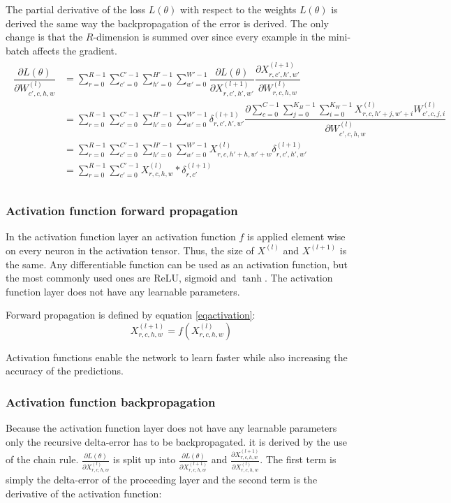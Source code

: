 \documentclass[a4paper,11pt,twoside]{article}
\newcommand*{\pd}[2]{\ensuremath{\dfrac{\partial #1}{\partial #2}}}
\newcommand*{\inpd}[2]{\ensuremath{\frac{\partial #1}{\partial #2}}}
\begin{document}
The partial derivative of the loss $L(\theta)$ with respect to the weights $L(\theta)$ is derived the same way the backpropagation of the error is derived. The only change is that the $R$-dimension is summed over since every example in the mini-batch affects the gradient. \cite{cs231n} \cite{webconv1} \cite{webconv2} \cite{webconv3} 
\begin{align}
\begin{split}
	\pd{L(\theta)}{W^{(l)}_{c',c,h,w}}
		& = \sum^{R-1}_{r=0} \sum^{C'-1}_{c'=0} \sum^{H'-1}_{h'=0} \sum^{W'-1}_{w'=0} \pd{L(\theta)}{X^{(l+1)}_{r,c',h',w'}} \pd{X^{(l+1)}_{r,c',h',w'}}{W^{(l)}_{r,c,h,w}} \\
		& = \sum^{R-1}_{r=0} \sum_{c'=0}^{C'-1} \sum^{H'-1}_{h'=0} \sum^{W'-1}_{w'=0} \delta^{(l+1)}_{r,c',h',w'} \pd{\sum\limits^{C-1}_{c=0} \sum\limits^{K_H-1}_{j=0} \sum\limits^{K_W-1}_{i=0} X^{(l)}_{r, c, h'+j, w'+i}W^{(l)}_{c', c, j, i}}{W^{(l)}_{c',c,h,w}} \\
		& = \sum^{R-1}_{r=0} \sum^{C'-1}_{c'=0} \sum^{H'-1}_{h'=0} \sum^{W'-1}_{w'=0} X^{(l)}_{r, c, h'+h, w'+w} \delta^{(l+1)}_{r,c',h',w'} \\
		& = \sum^{R-1}_{r=0} \sum^{C'-1}_{c'=0} X^{(l)}_{r, c, h, w} * \delta^{(l+1)}_{r,c'} \\
\end{split}
\end{align}

\subsubsection{Activation function forward propagation}
In the activation function layer an activation function $f$ is applied element wise on every neuron in the activation tensor. Thus, the size of $X^{(l)}$ and $X^{(l+1)}$ is the same. Any differentiable function can be used as an activation function, but the most commonly used ones are ReLU, sigmoid and $\tanh$. The activation function layer does not have any learnable parameters. \cite{convmath}
 
Forward propagation is defined by equation \eqref{eqactivation}:
\begin{equation}\label{eqactivation}
X^{(l+1)}_{r,c,h,w} = f(X^{(l)}_{r,c,h,w})
\end{equation}

Activation functions enable the network to learn faster while also increasing the accuracy of the predictions. \cite{cs231n}

\subsubsection{Activation function backpropagation}
Because the activation function layer does not have any learnable parameters only the recursive delta-error has to be backpropagated. it is derived by the use of the chain rule. $\inpd{L(\theta)}{X^{(l)}_{r,c,h,w}}$ is split up into $\inpd{L(\theta)}{X^{(l+1)}_{r,c,h,w}}$ and $\inpd{X^{(l+1)}_{r,c,h,w}}{X^{(l)}_{r,c,h,w}}$. The first term is simply the delta-error of the proceeding layer and the second term is the derivative of the activation function: \cite{cs231n} \cite{convmath}
\end{document}
